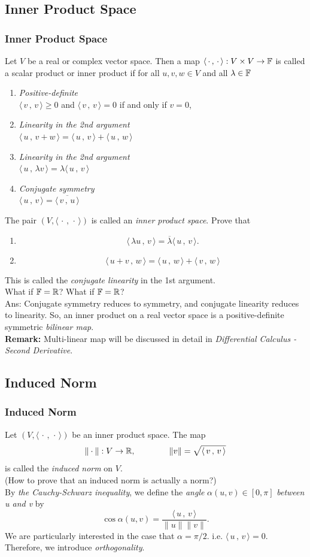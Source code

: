 \documentclass[12pt, t]{beamer}
\renewcommand{\emph}[1]{{\color{Turquoise3}\textsl{#1}}}
\newcommand{\nullspace}{~\\[15pt]}
\newcommand{\remark}{\textbf{Remark: }}
\newcommand{\scp}[2]{\langle\,#1\,,\,#2\,\rangle} \newcommand{\scpp}{\langle\,\cdot\,,\,\cdot\,\rangle}
\begin{document}
\subsection{Inner Product Space}
\begin{frame}[allowframebreaks]
    \frametitle{Inner Product Space}
    Let $V$ be a real or complex vector space. Then a map $\langle\,\cdot\,,\,\cdot\,\rangle: V\times V\rightarrow\mathbb{F}$ is called a scalar product or inner product if for all $u,v,w\in V$ and all $\lambda\in\mathbb{F}$
    \begin{enumerate}
        \item \textit{Positive-definite}\\ $\scp{v}{v}\geq0$ and $\scp{v}{v}=0$ if and only if $v=0$,
        \item \textit{Linearity in the 2nd argument}\\ $\scp{u}{v+w}=\scp{u}{v}+\scp{u}{w}$
        \item \textit{Linearity in the 2nd argument}\\ $\scp{u}{\lambda v}=\lambda\scp{u}{v}$
        \item \textit{Conjugate symmetry}\\ $\scp{u}{v}=\overline{\scp{v}{u}}$
    \end{enumerate}
    The pair $(V,\scpp)$ is called an \emph{inner product space}.
    \newpage
    Prove that
    \begin{enumerate}
        \item \[\scp{\lambda u}{v}=\overline{\lambda}\scp{u}{v}.\]
        \item \[\scp{u+v}{w}=\scp{u}{w}+\scp{v}{w}\]
    \end{enumerate}
    This is called the \emph{conjugate linearity} in the 1st argument.
    \nullspace
    What if $\mathbb{F}=\mathbb{R}$?
    \newpage
    What if $\mathbb{F}=\mathbb{R}$?
    \nullspace
    Ans: Conjugate symmetry reduces to symmetry, and conjugate linearity reduces to linearity. So, an inner product on a real vector space is a positive-definite symmetric \emph{bilinear map}.
    \nullspace
    \remark  Multi-linear map will be discussed in detail in \textsl{Differential Calculus - Second Derivative}.
\end{frame}

\subsection{Induced Norm}
\begin{frame}
    \frametitle{Induced Norm}
    Let $(V,\scpp)$ be an inner product space. The map
    \[\|\cdot\|:V\rightarrow\R,\qquad\qquad\|v\|=\sqrt{\scp{v}{v}}\]
    is called the \emph{induced norm} on $V$.
    \nullspace
    (How to prove that an induced norm is actually a norm?)
    \nullspace
    By \textit{the Cauchy-Schwarz inequality}, we define the \emph{angle} $\alpha(u,v)\in[0,\pi]$ \emph{between u and v} by
    \begin{equation}
        \cos\alpha(u,v)=\frac{\scp{u}{v}}{\|u\|\|v\|}.
    \end{equation}
    We are particularly interested in the case that $\alpha=\pi/2$. i.e. $\scp{u}{v}=0$. Therefore, we introduce \emph{orthogonality}.
\end{frame}
\end{document}
